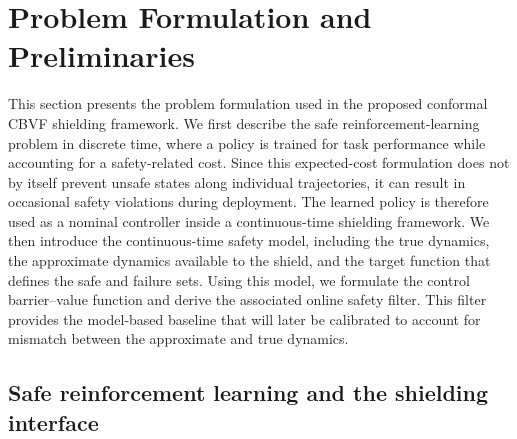 \documentclass[letterpaper,10pt,conference]{ieeeconf}
\begin{document}

\section{Problem Formulation and Preliminaries}

This section presents the problem formulation used in the proposed conformal
CBVF shielding framework. We first describe the safe reinforcement-learning
problem in discrete time, where a policy is trained for task performance while
accounting for a safety-related cost. Since this expected-cost formulation does
not by itself prevent unsafe states along individual trajectories, it can result
in occasional safety violations during deployment. The learned policy is
therefore used as a nominal controller inside a continuous-time shielding
framework. We then introduce the continuous-time safety model, including the true dynamics,
the approximate dynamics available to the shield, and the target function that
defines the safe and failure sets. Using this model, we formulate the control
barrier--value function and derive the associated online safety filter. This
filter provides the model-based baseline that will later be calibrated to
account for mismatch between the approximate and true dynamics.

\subsection{Safe reinforcement learning and the shielding interface}
\end{document}
